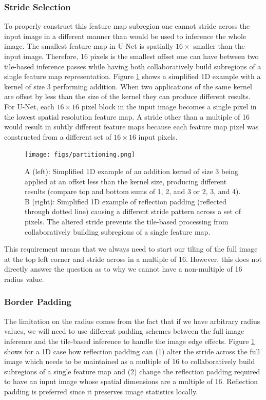 \documentclass[runningheads]{llncs}
\begin{document}
\subsubsection{Stride Selection}
To properly construct this feature map subregion one cannot stride across the input image in a different manner than would be used to inference the whole image. The smallest feature map in U-Net is spatially $16 \times$ smaller than the input image. Therefore, 16 pixels is the smallest offset one can have between two tile-based inference passes while having both collaboratively build subregions of a single feature map representation. Figure \ref{fig:offset} shows a simplified 1D example with a kernel of size 3 performing addition. When two applications of the same kernel are offset by less than the size of the kernel they can produce different results. 
For U-Net, each $16 \times 16$ pixel block in the input image becomes a single pixel in the lowest spatial resolution feature map. A stride other than a multiple of 16 would result in subtly different feature maps because each feature map pixel was constructed from a different set of $16 \times 16$ input pixels. 

\begin{figure}[h!]
	\centering
		\texttt{[image: figs/partitioning.png]}
	\caption{A (left): Simplified 1D example of an addition kernel of size 3 being applied at an offset less than the kernel size, producing different results (compare top and bottom sums of 1, 2, and 3 or 2, 3, and 4).
	B (right): Simplified 1D example of reflection padding (reflected through dotted line) causing a different stride pattern across a set of pixels. The altered stride prevents the tile-based processing from collaboratively building subregions of a single feature map.}
	\label{fig:offset}
\end{figure}

This requirement means that we always need to start our tiling of the full image at the top left corner and stride across in a multiple of 16. However, this does not directly answer the question as to why we cannot have a non-multiple of 16 radius value. 

\subsubsection{Border Padding}
The limitation on the radius comes from the fact that if we have arbitrary radius values, we will need to use different padding schemes between the full image inference and the tile-based inference to handle the image edge effects. Figure \ref{fig:offset} shows for a 1D case how reflection padding can (1) alter the stride across the full image which needs to be maintained as a multiple of 16 to collaboratively build subregions of a single feature map and (2) change the reflection padding required to have an input image whose spatial dimensions are a multiple of 16. Reflection padding is preferred since it preserves image statistics locally.
\end{document}
